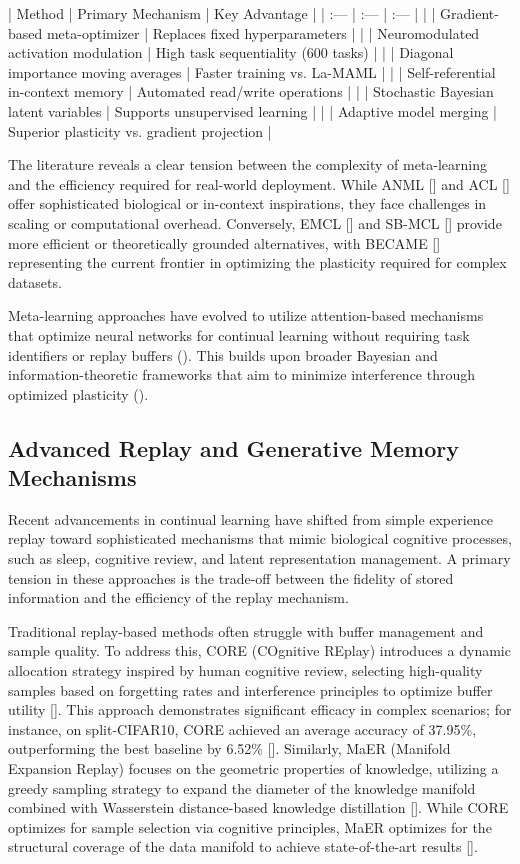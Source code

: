 \documentclass[11pt]{article}
\begin{document}
| Method | Primary Mechanism | Key Advantage |
| :--- | :--- | :--- |
| \citep{1806.06928} | Gradient-based meta-optimizer | Replaces fixed hyperparameters |
| \citep{2002.09571} | Neuromodulated activation modulation | High task sequentiality (600 tasks) |
| \citep{2210.00713} | Diagonal importance moving averages | Faster training vs. La-MAML |
| \citep{2312.00276} | Self-referential in-context memory | Automated read/write operations |
| \citep{2405.18758} | Stochastic Bayesian latent variables | Supports unsupervised learning |
| \citep{2504.02666} | Adaptive model merging | Superior plasticity vs. gradient projection |

The literature reveals a clear tension between the complexity of meta-learning and the efficiency required for real-world deployment. While ANML [\citep{2002.09571}] and ACL [\citep{2312.00276}] offer sophisticated biological or in-context inspirations, they face challenges in scaling or computational overhead. Conversely, EMCL [\citep{2210.00713}] and SB-MCL [\citep{2405.18758}] provide more efficient or theoretically grounded alternatives, with BECAME [\citep{2504.02666}] representing the current frontier in optimizing the plasticity required for complex datasets.

Meta-learning approaches have evolved to utilize attention-based mechanisms that optimize neural networks for continual learning without requiring task identifiers or replay buffers (\citep{2408.03219}). This builds upon broader Bayesian and information-theoretic frameworks that aim to minimize interference through optimized plasticity (\citep{2408.03219}).
\subsection{Advanced Replay and Generative Memory Mechanisms}

Recent advancements in continual learning have shifted from simple experience replay toward sophisticated mechanisms that mimic biological cognitive processes, such as sleep, cognitive review, and latent representation management. A primary tension in these approaches is the trade-off between the fidelity of stored information and the efficiency of the replay mechanism.

Traditional replay-based methods often struggle with buffer management and sample quality. To address this, CORE (COgnitive REplay) introduces a dynamic allocation strategy inspired by human cognitive review, selecting high-quality samples based on forgetting rates and interference principles to optimize buffer utility [\citep{2402.01348}]. This approach demonstrates significant efficacy in complex scenarios; for instance, on split-CIFAR10, CORE achieved an average accuracy of 37.95\%, outperforming the best baseline by 6.52\% [\citep{2402.01348}]. Similarly, MaER (Manifold Expansion Replay) focuses on the geometric properties of knowledge, utilizing a greedy sampling strategy to expand the diameter of the knowledge manifold combined with Wasserstein distance-based knowledge distillation [\citep{2310.08038}]. While CORE optimizes for sample selection via cognitive principles, MaER optimizes for the structural coverage of the data manifold to achieve state-of-the-art results [\citep{2310.08038}].
\end{document}
